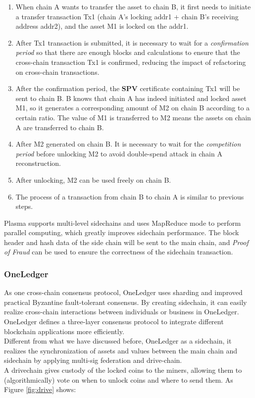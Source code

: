 \begin{enumerate}
    \item When chain A wants to transfer the asset to chain B, it first needs to initiate a transfer transaction Tx1 (chain A's locking addr1 $+$ chain B's receiving address addr2), and the asset M1 is locked on the addr1.
    \item After Tx1 transaction is submitted, it is necessary to wait for a \textit{confirmation period} so that there are enough blocks and calculations to ensure that the cross-chain transaction Tx1 is confirmed, reducing the impact of refactoring on cross-chain transactions.
    \item After the confirmation period, the \textbf{SPV} certificate containing Tx1 will be sent to chain B. B knows that chain A has indeed initiated and locked asset M1, so it generates a corresponding amount of M2 on chain B according to a certain ratio. The value of M1 is transferred to M2 means the assets on chain A are transferred to chain B.
    \item After M2 generated on chain B. It is necessary to wait for the \textit{competition period} before unlocking M2 to avoid double-spend attack in chain A reconstruction.
    \item After unlocking, M2 can be used freely on chain B.
    \item The process of a transaction from chain B to chain A is similar to previous steps.
\end{enumerate}
\noindent Plasma supports multi-level sidechains and uses MapReduce mode to perform parallel computing, which greatly improves sidechain performance. The block header and hash data of the side chain will be sent to the main chain, and \textit{Proof of Fraud} can be used to ensure the correctness of the sidechain transaction.


\subsubsection{OneLedger}
\noindent As one cross-chain consensus protocol, OneLedger\cite{Oneledger} uses sharding and improved practical Byzantine fault-tolerant consensus. By creating sidechain, it can easily realize cross-chain interactions between individuals or business in OneLedger. OneLedger defines a three-layer consensus protocol to integrate different blockchain applications more efficiently.\\
\noindent Different from what we have discussed before, OneLedger as a sidechain, it realizes the synchronization of assets and values between the main chain and sidechain by applying multi-sig federation and drive-chain.\\
\noindent A drivechain\cite{lerner2016drivechains} gives custody of the locked coins to the miners, allowing them to (algorithmically) vote on when to unlock coins and where to send them. As Figure \ref{fig:drive} shows:

